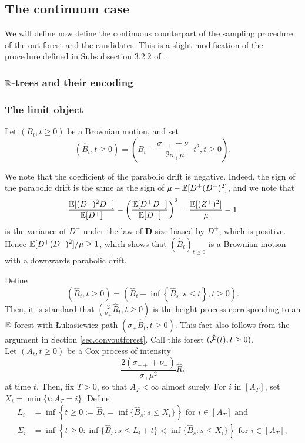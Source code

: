 \subsection{The continuum case}\label{subsec.limitobject}
We will define now define the continuous counterpart of the sampling procedure of the out-forest and the candidates. This is a slight modification of the procedure defined in Subsubsection 3.2.2 of \cite{Goldschmidt2019}. \\

\subsubsection{\texorpdfstring{${\mathbb R}$}{R}-trees and their encoding}


\subsubsection{The limit object}\label{subsubsec.samplecontinuousobject}
Let $(B_t,t\geq 0)$ be a Brownian motion, and set $$\left(\hat{B}_t,t\geq 0\right)=\left(B_t-\frac{\sigma_{-+}+\nu_-}{2\sigma_+\mu}t^2,t\geq 0\right).$$ 
\begin{remark}
We note that the coefficient of the parabolic drift is negative. Indeed, the sign of the parabolic drift is the same as the sign of $\mu-{\mathbb E}[D^+(D^-)^2]$, and we note that
$$\frac{{\mathbb E}[(D^-)^2D^+]}{{\mathbb E}[D^+]}-\left(\frac{{\mathbb E}[D^+D^-]}{{\mathbb E}[D^+]}\right)^2=\frac{{\mathbb E}[(Z^+)^2]}{\mu}-1$$
is the variance of $D^-$ under the law of $\mathbf{D}$ size-biased by $D^+$, which is positive. Hence ${\mathbb E}[D^+(D^-)^2]/\mu\geq 1$, which shows that $(\hat{B}_t)_{t\geq 0}$ is a Brownian motion with a downwards parabolic drift.
\end{remark}
Define 
$$(\hat{R}_t,t\geq 0)= \left(\hat{B}_t-\inf\left\{\hat{B}_s: s\leq t\right\},t\geq 0\right).$$
Then, it is standard that $\left(\frac{2}{\sigma_+}\hat{R}_t,t\geq 0\right)$ is the height process corresponding to an ${\mathbb R}$-forest with \L ukasiewicz path $\left(\sigma_+\hat{B}_t,t\geq 0\right)$.  This fact also follows from the argument in Section \ref{sec.convoutforest}. Call this forest $(\hat{{\mathcal F}}(t),t\geq 0)$. \\
Let $(A_t,t\geq 0)$ be a Cox process of intensity $$\frac{2(\sigma_{-+}+\nu_-)}{\sigma_+\mu^2} \hat{R}_t$$ at time $t$. Then, fix $T>0$, so that $A_T<\infty$ almost surely. For $i$ in $\left[A_T\right]$, set $X_i=\min\{t:A_T=i\}$. Define
\begin{align*}
L_i&=\inf\left\{t\geq 0:=\hat{B}_t=\inf\{\hat{B}_s:s\leq X_i\}\right\}\text{ for }i\in \left[A_T\right]\text{ and}\\
\Sigma_i&=\inf\left\{ t\geq 0: \inf\{\hat{B}_s:s\leq L_i+t\} < \inf\{\hat{B}_s:s\leq X_i\}\right\}\text{ for }i\in \left[A_T\right],
\end{align*}

